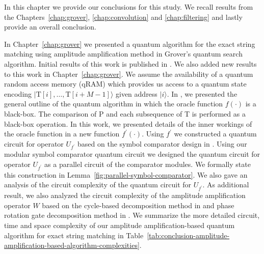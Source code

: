 In this chapter we provide our conclusions for this study. We recall results from the Chapters~\ref{chap:grover}, \ref{chap:convolution} and \ref{chap:filtering} and lastly provide an overall conclusion.


In Chapter~\ref{chap:grover} we presented a quantum algorithm for the exact string matching using amplitude amplification method in Grover's quantum search algorithm. Initial results of this work is published in \cite{Aborot2013}. We also added new results to this work in Chapter~\ref{chap:grover}. We assume the availability of a quantum random access memory (qRAM) \cite{Giovannetti2008,Giovannetti2008a} which provides us access to a quantum state encoding $\vert \mathrm{T}[i],\ldots,\mathrm{T}[i+M-1] \rangle$ given address $\vert i \rangle$. In \cite{Aborot2013}, we presented the general outline of the quantum algorithm in which the oracle function $f(\cdot)$ is a black-box. The comparison of P and each subsequence of T is performed as a black-box operation. In this work, we presented details of the inner workings of the oracle function in a new function $f^\prime(\cdot)$. Using $f^\prime$ we constructed a quantum circuit for operator $U_{f^\prime}$ based on the symbol comparator design in \cite{Thapliyal2010}. Using our modular symbol comparator quantum circuit we designed the quantum circuit for operator $U_{f^\prime}$ as a parallel circuit of the comparator modules. We formally state this construction in Lemma~\ref{fig:parallel-symbol-comparator}. We also gave an analysis of the circuit complexity of the quantum circuit for $U_{f^\prime}$. As additional result, we also analyzed the circuit complexity of the amplitude amplification operator $W$ based on the cycle-based decomposition method in \cite{Welch2014b,Welch2014c,Welch2015} and phase rotation gate decomposition method in \cite{Bocharov2015}. We summarize the more detailed circuit, time and space complexity of our amplitude amplification-based quantum algorithm for exact string matching in Table~\ref{tab:conclusion-amplitude-amplification-based-algorithm-complexities}.

